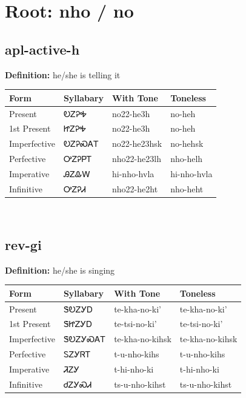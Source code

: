 \documentclass{article}%
\begin{document}
%
\normalsize%
\section*{Root: nho / no}%
\subsection*{apl-active-h}%
\textbf{Definition: }%
he/she is telling it%
\\[0.5em]%
\begin{tabular}{|l|l|l|l|}%
\hline%
\textbf{Form}&\textbf{Syllabary}&\textbf{With Tone}&\textbf{Toneless}\\%
\hline%
Present&ᎧᏃᎮᎭ&no22{-}he3h&no{-}heh\\%
1st Present&ᏥᏃᎮᎭ&no22{-}he3h&no{-}heh\\%
Imperfective&ᎧᏃᎮᏍᎪᎢ&no22{-}he23hsk&no{-}hehsk\\%
Perfective&ᎤᏃᎮᏢᎢ&nho22{-}he23lh&nho{-}helh\\%
Imperative&ᎯᏃᎲᎳ&hi{-}nho{-}hvla&hi{-}nho{-}hvla\\%
Infinitive&ᎤᏃᎮᏗ&nho22{-}he2ht&nho{-}heht\\%
\hline%
\end{tabular}%
\\[1em]%
\subsection*{rev-gi}%
\textbf{Definition: }%
he/she is singing%
\\[0.5em]%
\begin{tabular}{|l|l|l|l|}%
\hline%
\textbf{Form}&\textbf{Syllabary}&\textbf{With Tone}&\textbf{Toneless}\\%
\hline%
Present&ᏕᎧᏃᎩᎠ&te{-}kha{-}no{-}ki'&te{-}kha{-}no{-}ki'\\%
1st Present&ᏕᏥᏃᎩᎠ&te{-}tsi{-}no{-}ki'&te{-}tsi{-}no{-}ki'\\%
Imperfective&ᏕᎧᏃᎩᏍᎪᎢ&te{-}kha{-}no{-}kihsk&te{-}kha{-}no{-}kihsk\\%
Perfective&ᏚᏃᎩᏒᎢ&t{-}u{-}nho{-}kihs&t{-}u{-}nho{-}kihs\\%
Imperative&ᏘᏃᎩ&t{-}hi{-}nho{-}ki&t{-}hi{-}nho{-}ki\\%
Infinitive&ᏧᏃᎩᏍᏗ&ts{-}u{-}nho{-}kihst&ts{-}u{-}nho{-}kihst\\%
\hline%
\end{tabular}%
\\[1em]%
\end{document}
